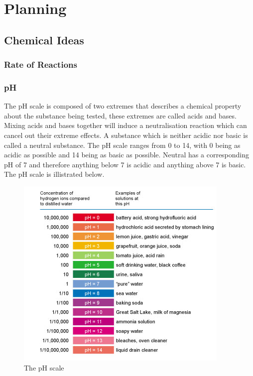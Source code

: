 \chapter {Planning}

\section {Chemical Ideas}

	\subsection{Rate of Reactions}




	\subsection{pH}

The pH scale is composed of two extremes that describes a chemical property about the substance being tested, these extremes are called acids and bases. Mixing acids and bases together will induce a neutralisation reaction which can cancel out their extreme effects. A substance which is neither acidic nor basic is called a neutral substance. The pH scale ranges from 0 to 14, with 0 being as acidic as possible and 14 being as basic as possible. Neutral has a corresponding pH of 7 and therefore anything below 7 is acidic and anything above 7 is basic. The pH scale is illistrated below.


\begin{figure}[H]
    \includegraphics[width=\textwidth]{./Planning/Images/pHScale.jpg}
    \caption{The pH scale} \label{fig:pH Scale}
\end{figure}

